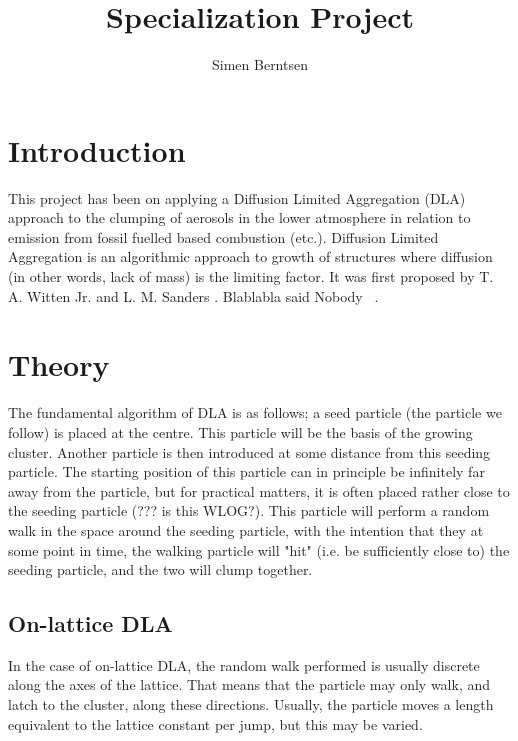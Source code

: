\documentclass{article}
\title{Specialization Project}
\author{Simen Berntsen}
\begin{document}
\maketitle



\section{Introduction}
This project has been on applying a Diffusion Limited Aggregation (DLA) approach to the clumping of aerosols in the lower atmosphere in relation to emission from fossil fuelled based combustion (etc.). Diffusion Limited Aggregation is an algorithmic approach to growth of structures where diffusion (in other words, lack of mass) is the limiting factor. It was first proposed by T. A. Witten Jr. and L. M. Sanders \cite{witten_and_sanders81}.  Blablabla said Nobody ~\cite{Nobody06}.


\section{Theory}

The fundamental algorithm of DLA is as follows; a seed particle (the particle we follow) is placed at the centre. This particle will be the basis of the growing cluster. Another particle is then introduced at some distance from this seeding particle. The starting position of this particle can in principle be infinitely far away from the particle, but for practical matters, it is often placed rather close to the seeding particle (??? is this WLOG?). This particle will perform a random walk in the space around the seeding particle, with the intention that they at some point in time, the walking particle will "hit" (i.e. be sufficiently close to) the seeding particle, and the two will clump together. 

\subsection{On-lattice DLA}
In the case of on-lattice DLA, the random walk performed is usually discrete along the axes of the lattice. That means that the particle may only walk, and latch to the cluster, along these directions. Usually, the particle moves a length equivalent to the lattice constant per jump, but this may be varied. 
\end{document}
